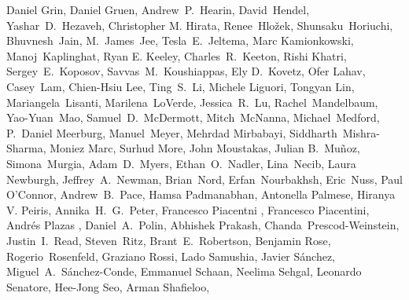 \begin{raggedright}
Daniel Grin,
Daniel Gruen,
Andrew~P.~Hearin,
David~Hendel,
Yashar~D.~Hezaveh,
Christopher M. Hirata,
Renee~Hlo\v{z}ek,
Shunsaku~Horiuchi,
Bhuvnesh~Jain,
M.~James~Jee,
Tesla~E.~Jeltema,
Marc Kamionkowski,
Manoj~Kaplinghat,
Ryan E. Keeley,
Charles~R.~Keeton,
Rishi Khatri,
Sergey~E.~Koposov,
Savvas~M.~Koushiappas,
Ely D.~Kovetz,
Ofer Lahav,
Casey~Lam,
Chien-Hsiu Lee,
Ting~S.~Li,
Michele Liguori,
Tongyan Lin,
Mariangela~Lisanti,
Marilena~LoVerde,
Jessica~R.~Lu,
Rachel~Mandelbaum,
Yao-Yuan~Mao,
Samuel~D.~McDermott,
Mitch~McNanna,
Michael~Medford,
P.~Daniel Meerburg,
Manuel~Meyer,
Mehrdad Mirbabayi,
Siddharth~Mishra-Sharma,
Moniez Marc,
Surhud More,
John Moustakas,
Julian B.~Mu\~noz,
Simona~Murgia,
Adam~D.~Myers,
Ethan~O.~Nadler,
Lina~Necib,
Laura Newburgh,
Jeffrey~A.~Newman,
Brian~Nord,
Erfan~Nourbakhsh,
Eric~Nuss,
Paul O'Connor,
Andrew~B.~Pace,
Hamsa Padmanabhan,
Antonella Palmese,
Hiranya V. Peiris,
Annika~H.~G.~Peter,
Francesco Piacentni ,
Francesco Piacentini,
Andr\'es Plazas ,
Daniel~A.~Polin,
Abhishek Prakash,
Chanda~Prescod-Weinstein,
Justin~I.~Read,
Steven~Ritz,
Brant~E.~Robertson,
Benjamin Rose,
Rogerio~Rosenfeld,
Graziano Rossi,
Lado Samushia,
Javier S\'{a}nchez,
Miguel~A.~S\'anchez-Conde,
Emmanuel Schaan,
Neelima Sehgal,
Leonardo Senatore,
Hee-Jong Seo,
Arman Shafieloo,

\end{raggedright}
